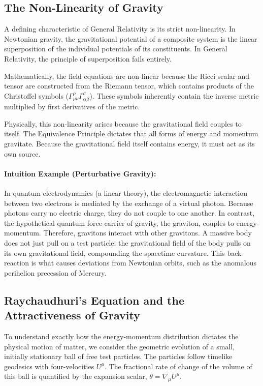 \documentclass[11pt, a4paper]{report}
\begin{document}
\subsection{The Non-Linearity of Gravity}

A defining characteristic of General Relativity is its strict non-linearity. In Newtonian gravity, the gravitational potential of a composite system is the linear superposition of the individual potentials of its constituents. In General Relativity, the principle of superposition fails entirely. 

Mathematically, the field equations are non-linear because the Ricci scalar and tensor are constructed from the Riemann tensor, which contains products of the Christoffel symbols ($\Gamma^\rho_{\mu\nu}\Gamma^\sigma_{\alpha\beta}$). These symbols inherently contain the inverse metric multiplied by first derivatives of the metric. 

Physically, this non-linearity arises because the gravitational field couples to itself. The Equivalence Principle dictates that all forms of energy and momentum gravitate. Because the gravitational field itself contains energy, it must act as its own source. 

\paragraph{Intuition Example (Perturbative Gravity):} 
In quantum electrodynamics (a linear theory), the electromagnetic interaction between two electrons is mediated by the exchange of a virtual photon. Because photons carry no electric charge, they do not couple to one another. In contrast, the hypothetical quantum force carrier of gravity, the graviton, couples to energy-momentum. Therefore, gravitons interact with other gravitons. A massive body does not just pull on a test particle; the gravitational field of the body pulls on its own gravitational field, compounding the spacetime curvature. This back-reaction is what causes deviations from Newtonian orbits, such as the anomalous perihelion precession of Mercury.

\subsection{Raychaudhuri's Equation and the Attractiveness of Gravity}

To understand exactly how the energy-momentum distribution dictates the physical motion of matter, we consider the geometric evolution of a small, initially stationary ball of free test particles. The particles follow timelike geodesics with four-velocities $U^{\mu}$. The fractional rate of change of the volume of this ball is quantified by the expansion scalar, $\theta = \nabla_{\mu}U^{\mu}$. 
\end{document}
